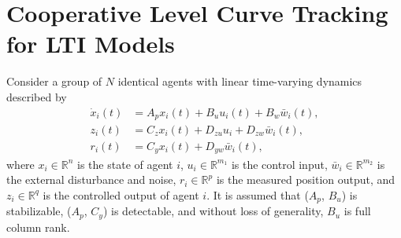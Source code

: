 









\section{Cooperative Level Curve Tracking for LTI Models}  \label{sec:lc_ltimodel}

Consider a group of $N$ identical agents with linear time-varying dynamics described by
\begin{align}\label{eq:lct_LTImodel}
\dot{x}_i(t) & = A_px_i(t) + B_u u_i(t) + B_w \bar{w}_i(t),\nonumber \\
z_i(t) & =  C_z x_i (t) + D_{zu}u_i + D_{zw} \bar{w}_i(t), \nonumber \\
r_i(t) & =  C_y x_i (t) + D_{yw} \bar{w}_i(t),
\end{align}
where 
$x_i \in \mathbb{R}^n$ is the state of agent $i$, 
$u_i \in \mathbb{R}^{m_1}$ is the control input, 
$\bar{w}_i \in \mathbb{R}^{m_2}$ is the external disturbance and noise, 
$r_i \in \mathbb{R}^p$ is the measured position output, 
and $z_i \in \mathbb{R}^q$ is the controlled output of agent $i$. 
It is assumed that ($A_p$, $B_u$) is stabilizable, ($A_p$, $C_y$) is detectable, and without loss of generality, $B_u$ is full column rank.

